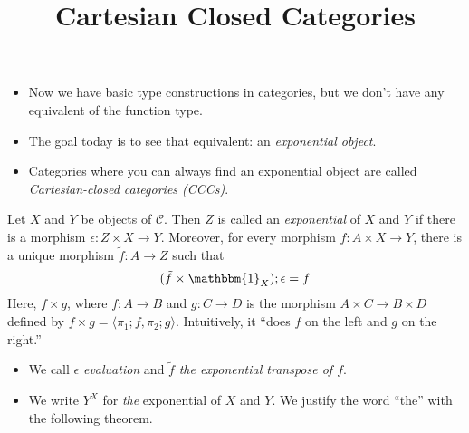 \documentclass{lecturenotes}
\title{Cartesian Closed Categories}
\newcommand{\id}[1][]{\ensuremath{\mathbbm{1}_{#1}}}
\newcommand{\prodmor}[2]{\ensuremath{\langle #1, #2 \rangle}}
\begin{document}
\maketitle

\begin{itemize}
\item Now we have basic type constructions in categories, but we don't have any equivalent of the function type.
\item The goal today is to see that equivalent: an \emph{exponential object}.
\item Categories where you can always find an exponential object are called \emph{Cartesian-closed categories (CCCs)}.
\end{itemize}

\begin{defn}
  Let $X$ and $Y$ be objects of $\mathcal{C}$.
  Then $Z$ is called an \emph{exponential} of $X$ and $Y$ if there is a morphism $\epsilon : Z \times X \to Y$.
  Moreover, for every morphism $f : A \times X \to Y$, there is a unique morphism $\tilde{f} : A \to Z$ such that $$(\tilde{f} \times \id[X]); \epsilon = f$$
  Here, $f \times g$, where $f : A \to B$ and $g : C \to D$ is the morphism $A \times C \to B \times D$ defined by $f \times g = \prodmor{\pi_1; f}{\pi_2; g}$.
  Intuitively, it ``does $f$ on the left and $g$ on the right.''
\end{defn}

\begin{itemize}
\item We call $\epsilon$ \emph{evaluation} and $\tilde{f}$ \emph{the exponential transpose of $f$}.
\item We write $Y^X$ for \emph{the} exponential of $X$ and $Y$.
  We justify the word ``the'' with the following theorem.
\end{itemize}
\end{document}

